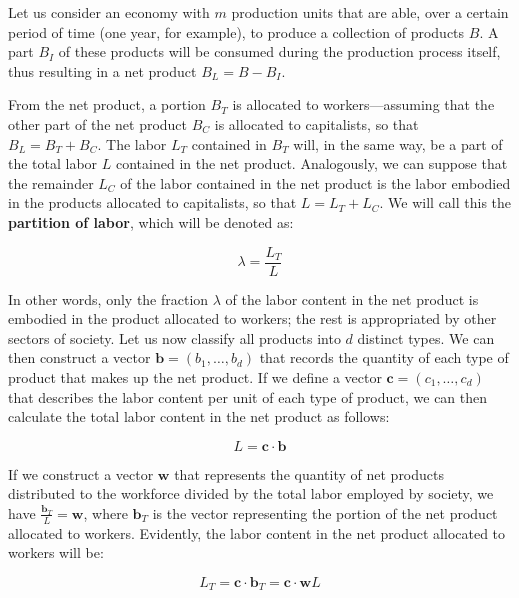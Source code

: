 
Let us consider an economy with $m$ production units that are able, over a certain period of time (one year, for example), to produce a collection of products $B$. A part $B_{I}$ of these products will be consumed during the production process itself, thus resulting in a net product $B_{L}=B-B_{I}$.

From the net product, a portion $B_{T}$ is allocated to workers—assuming that the other part of the net product $B_{C}$ is allocated to capitalists, so that $B_{L}=B_{T}+B_{C}$. The labor $L_{T}$ contained in $B_{T}$ will, in the same way, be a part of the total labor $L$ contained in the net product. Analogously, we can suppose that the remainder $L_{C}$ of the labor contained in the net product is the labor embodied in the products allocated to capitalists, so that $L=L_{T}+L_{C}$. We will call this the \textbf{partition of labor}, which will be denoted as:

\begin{equation}
\lambda=\frac{L_{T}}{L}
\end{equation}

In other words, only the fraction $\lambda$ of the labor content in the net product is embodied in the product allocated to workers; the rest is appropriated by other sectors of society. Let us now classify all products into $d$ distinct types. We can then construct a vector $\boldsymbol{b}=\left(b_{1},\dots,b_{d}\right)$ that records the quantity of each type of product that makes up the net product. If we define a vector $\boldsymbol{c}=\left(c_{1},\dots,c_{d}\right)$ that describes the labor content per unit of each type of product, we can then calculate the total labor content in the net product as follows:


\begin{equation}
L=\boldsymbol{c}\cdot\boldsymbol{b}
\end{equation}

If we construct a vector $\boldsymbol{w}$ that represents the quantity of net products distributed to the workforce divided by the total labor employed by society, we have $\frac{\boldsymbol{b}_{T}}{L}=\boldsymbol{w}$, where $\boldsymbol{b}_{T}$ is the vector representing the portion of the net product allocated to workers. Evidently, the labor content in the net product allocated to workers will be:


\begin{equation}
L_{T}=\boldsymbol{c}\cdot\boldsymbol{b}_{T}=\boldsymbol{c}\cdot\boldsymbol{w}L
\end{equation}


